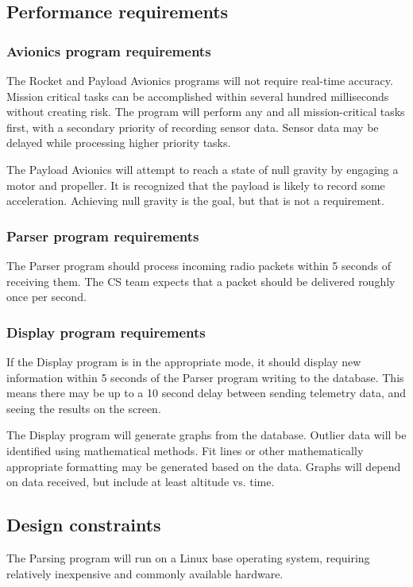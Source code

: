 \documentclass[onecolumn, draftclsnofoot, 10pt, compsoc]{IEEEtran}
\begin{document}
\subsection{Performance requirements}

\subsubsection{Avionics program requirements}
The Rocket and Payload Avionics programs will not require real-time accuracy.  Mission critical tasks can be accomplished within several hundred milliseconds without creating risk.  The program will perform any and all mission-critical tasks first, with a secondary priority of recording sensor data.  Sensor data may be delayed while processing higher priority tasks.

The Payload Avionics will attempt to reach a state of null gravity by engaging a motor and propeller.  It is recognized that the payload is likely to record some acceleration.  Achieving null gravity is the goal, but that is not a requirement.

\subsubsection{Parser program requirements}
The Parser program should process incoming radio packets within 5 seconds of receiving them. The CS team expects that a packet should be delivered roughly once per second.

\subsubsection{Display program requirements}
If the Display program is in the appropriate mode, it should display new information within 5 seconds of the Parser program writing to the database.  This means there may be up to a 10 second delay between sending telemetry data, and seeing the results on the screen.

The Display program will generate graphs from the database. Outlier data will be identified using mathematical methods. Fit lines or other mathematically appropriate formatting may be generated based on the data. Graphs will depend on data received, but include at least altitude vs. time.

\subsection{Design constraints}
The Parsing program will run on a Linux base operating system, requiring relatively inexpensive and commonly available hardware.
\end{document}
